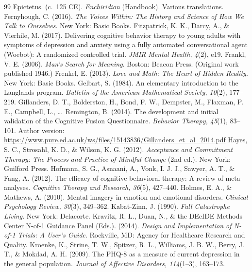 \documentclass[11pt]{article}
\begin{document}
\begin{thebibliography}{99}
 Epictetus. (c.~125 CE). \emph{Enchiridion} (Handbook). Various translations.
 Fernyhough, C. (2016). \emph{The Voices Within: The History and Science of How We Talk to Ourselves}. New York: Basic Books.
 Fitzpatrick, K. K., Darcy, A., \& Vierhile, M. (2017). Delivering cognitive behavior therapy to young adults with symptoms of depression and anxiety using a fully automated conversational agent (Woebot): A randomized controlled trial. \emph{JMIR Mental Health, 4}(2), e19.
 Frankl, V. E. (2006). \emph{Man's Search for Meaning}. Boston: Beacon Press. (Original work published 1946.)
 Frenkel, E. (2013). \emph{Love and Math: The Heart of Hidden Reality}. New York: Basic Books.
 Gelbart, S. (1984). An elementary introduction to the Langlands program. \emph{Bulletin of the American Mathematical Society, 10}(2), 177--219.
 Gillanders, D. T., Bolderston, H., Bond, F. W., Dempster, M., Flaxman, P. E., Campbell, L., \ldots\ Remington, B. (2014). The development and initial validation of the Cognitive Fusion Questionnaire. \emph{Behavior Therapy, 45}(1), 83--101. Author version: \url{https://www.pure.ed.ac.uk/ws/files/15143836/Gillanders_et_al_2014.pdf}
 Hayes, S. C., Strosahl, K. D., \& Wilson, K. G. (2012). \emph{Acceptance and Commitment Therapy: The Process and Practice of Mindful Change} (2nd ed.). New York: Guilford Press.
 Hofmann, S. G., Asnaani, A., Vonk, I. J. J., Sawyer, A. T., \& Fang, A. (2012). The efficacy of cognitive behavioral therapy: A review of meta-analyses. \emph{Cognitive Therapy and Research, 36}(5), 427--440.
 Holmes, E. A., \& Mathews, A. (2010). Mental imagery in emotion and emotional disorders. \emph{Clinical Psychology Review, 30}(3), 349--362.
 Kabat-Zinn, J. (1990). \emph{Full Catastrophe Living}. New York: Delacorte.
 Kravitz, R. L., Duan, N., \& the DEcIDE Methods Center N-of-1 Guidance Panel (Eds.). (2014). \emph{Design and Implementation of N-of-1 Trials: A User's Guide}. Rockville, MD: Agency for Healthcare Research and Quality.
 Kroenke, K., Strine, T. W., Spitzer, R. L., Williams, J. B. W., Berry, J. T., \& Mokdad, A. H. (2009). The PHQ-8 as a measure of current depression in the general population. \emph{Journal of Affective Disorders, 114}(1--3), 163--173.

\end{thebibliography}
\end{document}

